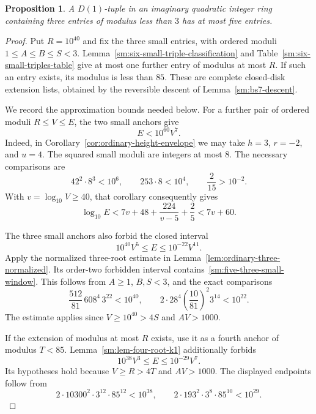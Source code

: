 \documentclass[12pt]{article}
\newtheorem{proposition}[theorem]{Proposition}
\numberwithin{equation}{section}
\begin{document}
\begin{proposition}\label{sm:five-three-small}
A $D(1)$-tuple in an imaginary quadratic integer ring containing
three entries of modulus less than $3$ has at most five entries.
\end{proposition}
\begin{proof}
Put $R=10^{40}$ and fix the three small entries, with ordered
moduli $1\le A\le B\le S<3$.
Lemma~\ref{sm:six-small-triple-classification} and
Table~\ref{sm:six-small-triples-table} give at most one further entry
of modulus at most $R$. If such an entry exists, its modulus is
less than $85$. These are complete closed-disk extension lists,
obtained by the reversible descent of Lemma~\ref{sm:bs7-descent}.

We record the approximation bounds needed below. For a further
pair of ordered moduli $R\le V\le E$, the two small anchors give
\begin{equation}\label{sm:five-small-upper}
 E<10^{60}V^7.
\end{equation}
Indeed, in Corollary~\ref{cor:ordinary-height-envelope} we may take
$h=3$, $r=-2$, and $u=4$. The squared small moduli are integers at most $8$. The necessary comparisons are
\[
 42^2\cdot8^3<10^6,\qquad 253\cdot8<10^4,\qquad
 \frac2{15}>10^{-2}.
\]
With $v=\log_{10}V\ge40$, that corollary consequently gives
\[
 \log_{10}E<7v+48+\frac{224}{v-5}+\frac25<7v+60.
\]

The three small anchors also forbid the closed interval
\begin{equation}\label{sm:five-three-small-window}
 10^{40}V^5\le E\le10^{-22}V^{11}.
\end{equation}
Apply the normalized three-root estimate
in Lemma~\ref{lem:ordinary-three-normalized}. Its order-two forbidden
interval contains~\eqref{sm:five-three-small-window}. This follows from
$A\ge1$, $B,S<3$, and the exact comparisons
\[
 \frac{512}{81}\,608^4\,3^{22}<10^{40},\qquad
 2\cdot28^4\left(\frac{10}{81}\right)^2 3^{14}<10^{22}.
\]
The estimate applies since $V\ge10^{40}>4S$ and $AV>1000$.

If the extension of modulus at most $R$ exists, use it as a fourth
anchor of modulus $T<85$. Lemma~\ref{sm:lem-four-root-k1} additionally forbids
\begin{equation}\label{sm:five-four-fixed-window}
 10^{38}V^3\le E\le10^{-29}V^7.
\end{equation}
Its hypotheses hold because $V\ge R>4T$ and $AV>1000$.
The displayed endpoints follow from
\[
 2\cdot10300^2\cdot3^{12}\cdot85^{12}<10^{38},\qquad
 2\cdot193^2\cdot3^8\cdot85^{10}<10^{29}.
\]


\end{proof}
\end{document}
